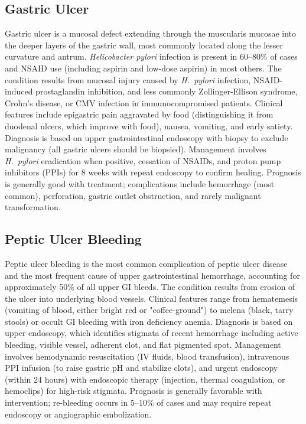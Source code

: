 \subsection{Gastric Ulcer}
\label{sec:Gastric Ulcer}
Gastric ulcer is a mucosal defect extending through the muscularis mucosae into the deeper layers of the gastric wall, most commonly located along the lesser curvature and antrum. \textit{Helicobacter pylori} infection is present in 60--80\% of cases and NSAID use (including aspirin and low-dose aspirin) in most others. The condition results from mucosal injury caused by \textit{H.~pylori} infection, NSAID-induced prostaglandin inhibition, and less commonly Zollinger-Ellison syndrome, Crohn's disease, or CMV infection in immunocompromised patients. Clinical features include epigastric pain aggravated by food (distinguishing it from duodenal ulcers, which improve with food), nausea, vomiting, and early satiety. Diagnosis is based on upper gastrointestinal endoscopy with biopsy to exclude malignancy (all gastric ulcers should be biopsied). Management involves \textit{H.~pylori} eradication when positive, cessation of NSAIDs, and proton pump inhibitors (PPIs) for 8 weeks with repeat endoscopy to confirm healing. Prognosis is generally good with treatment; complications include hemorrhage (most common), perforation, gastric outlet obstruction, and rarely malignant transformation.


\subsection{Peptic Ulcer Bleeding}
\label{sec:Peptic Ulcer Bleeding}
Peptic ulcer bleeding is the most common complication of peptic ulcer disease and the most frequent cause of upper gastrointestinal hemorrhage, accounting for approximately 50\% of all upper GI bleeds. The condition results from erosion of the ulcer into underlying blood vessels. Clinical features range from hematemesis (vomiting of blood, either bright red or "coffee-ground") to melena (black, tarry stools) or occult GI bleeding with iron deficiency anemia. Diagnosis is based on upper endoscopy, which identifies stigmata of recent hemorrhage including active bleeding, visible vessel, adherent clot, and flat pigmented spot. Management involves hemodynamic resuscitation (IV fluids, blood transfusion), intravenous PPI infusion (to raise gastric pH and stabilize clots), and urgent endoscopy (within 24 hours) with endoscopic therapy (injection, thermal coagulation, or hemoclips) for high-risk stigmata. Prognosis is generally favorable with intervention; re-bleeding occurs in 5--10\% of cases and may require repeat endoscopy or angiographic embolization.


